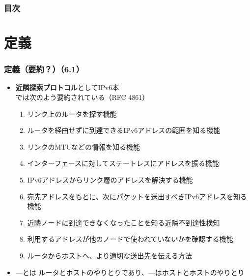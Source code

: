 \begin{frame}
  \frametitle{目次}

  \tableofcontents
\end{frame}

\section{定義}

\begin{frame}
  \frametitle{定義（要約？）（6.1）}

  \begin{itemize}
    \item \textbf{近隣探索プロトコル}としてIPv6本\cite{小川晃通2021-12-20}では次のよう要約されている（RFC 4861）
    \begin{enumerate}
      \item リンク上のルータを探す機能\label{enum:protocol_1}
      \item ルータを経由せずに到達できるIPv6アドレスの範囲を知る機能
      \item リンクのMTUなどの情報を知る機能\label{enum:protocol_3}
      \item インターフェースに対してステートレスにアドレスを振る機能\label{enum:protocol_4}
      \item IPv6アドレスからリンク層のアドレスを解決する機能
      \item 宛先アドレスをもとに、次にパケットを送出すべきIPv6アドレスを知る機能
      \item 近隣ノードに到達できなくなったことを知る近隣不到達性検知
      \item 利用するアドレスが他のノードで使われていないかを確認する機能\label{enum:protocol_8}
      \item ルータからホストへ、より適切な送出先を伝える方法\label{enum:protocol_9}
    \end{enumerate}

    \item {}---とは
    ルータとホストのやりとりであり、---はホストとホストのやりとり
  \end{itemize}
\end{frame}

